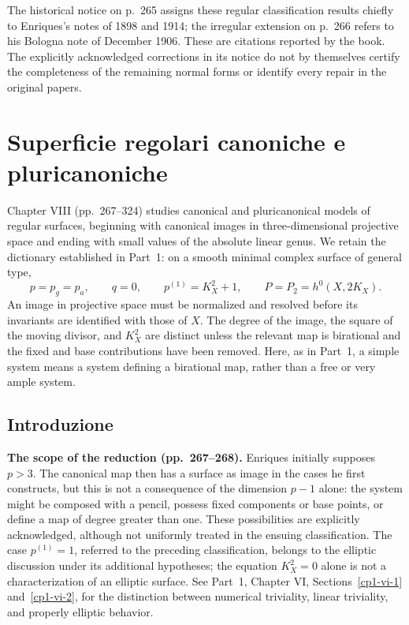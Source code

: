 The historical notice on p.~265 assigns these regular classification results chiefly to Enriques's notes of 1898 and 1914; the irregular extension on p.~266 refers to his Bologna note of December 1906. These are citations reported by the book. The explicitly acknowledged corrections in its notice do not by themselves certify the completeness of the remaining normal forms or identify every repair in the original papers.



\chapter{Superficie regolari canoniche e pluricanoniche}
\label{cp2-ch-viii}

Chapter VIII (pp.~267--324) studies canonical and pluricanonical models of regular surfaces, beginning with canonical images in three-dimensional projective space and ending with small values of the absolute linear genus. We retain the dictionary established in Part~1: on a smooth minimal complex surface of general type,
\[
p=p_g=p_a,\qquad q=0,\qquad p^{(1)}=K_X^2+1,\qquad
P=P_2=h^0(X,2K_X).
\]
An image in projective space must be normalized and resolved before its invariants are identified with those of \(X\). The degree of the image, the square of the moving divisor, and \(K_X^2\) are distinct unless the relevant map is birational and the fixed and base contributions have been removed. Here, as in Part~1, a simple system means a system defining a birational map, rather than a free or very ample system.

\section{Introduzione}
\label{cp2-viii-1}

\textbf{The scope of the reduction (pp.~267--268).}
Enriques initially supposes \(p>3\). The canonical map then has a surface as image in the cases he first constructs, but this is not a consequence of the dimension \(p-1\) alone: the system might be composed with a pencil, possess fixed components or base points, or define a map of degree greater than one. These possibilities are explicitly acknowledged, although not uniformly treated in the ensuing classification. The case \(p^{(1)}=1\), referred to the preceding classification, belongs to the elliptic discussion under its additional hypotheses; the equation \(K_X^2=0\) alone is not a characterization of an elliptic surface. See Part~1, Chapter VI, Sections~\ref{cp1-vi-1} and~\ref{cp1-vi-2}, for the distinction between numerical triviality, linear triviality, and properly elliptic behavior.


